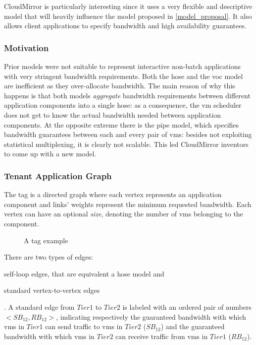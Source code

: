 CloudMirror \cite{cloudmirror} is particularly interesting since it uses a very flexible and descriptive \gls{model} that will heavily influence the model proposed in \autoref{model_proposal}.
It also allows client applications to specify bandwidth and high availability guarantees.

\subsubsection{Motivation} \label{why_tag}
Prior \glspl{model} were not suitable to represent interactive non-batch applications with very stringent bandwidth requirements.
Both the hose and the \gls{voc} model are inefficient as they over-allocate bandwidth.
The main reason of why this happens is that both models \textit{aggregate} bandwidth requirements between different application components into a single hose: as a consequence, the \gls{vm} scheduler does not get to know the actual bandwidth needed between application components.
At the opposite extreme there is the pipe model, which specifies bandwidth guarantees between each and every pair of \glspl{vm}: besides not exploiting statistical multiplexing, it is clearly not scalable.
This led CloudMirror \cite{cloudmirror} inventors to come up with a new model.

\subsubsection{Tenant Application Graph} \label{tag_description}
The \gls{tag} is a directed graph where each vertex represents an application component and links' weights represent the minimum requested bandwidth.
Each vertex can have an optional \textit{size}, denoting the number of \glspl{vm} belonging to the component.

\begin{figure}[!htb]
    \centering
    \usebox{\tagfigure}
    \caption{A \gls{tag} example}
\end{figure}

There are two types of edges:
\begin{mylist}
    \item self-loop edges, that are equivalent a hose model and
    \item standard vertex-to-vertex edges
\end{mylist}.
A standard edge from $Tier 1$ to $Tier 2$ is labeled with an ordered pair of numbers $<SB_{12}, RB_{12}>$, indicating respectively the guaranteed bandwidth with which \glspl{vm} in $Tier 1$ can send traffic to \glspl{vm} in $Tier 2$ ($SB_{12}$) and the guaranteed bandwidth with which \glspl{vm} in $Tier 2$ can receive traffic from \glspl{vm} in $Tier 1$ ($RB_{12}$).

